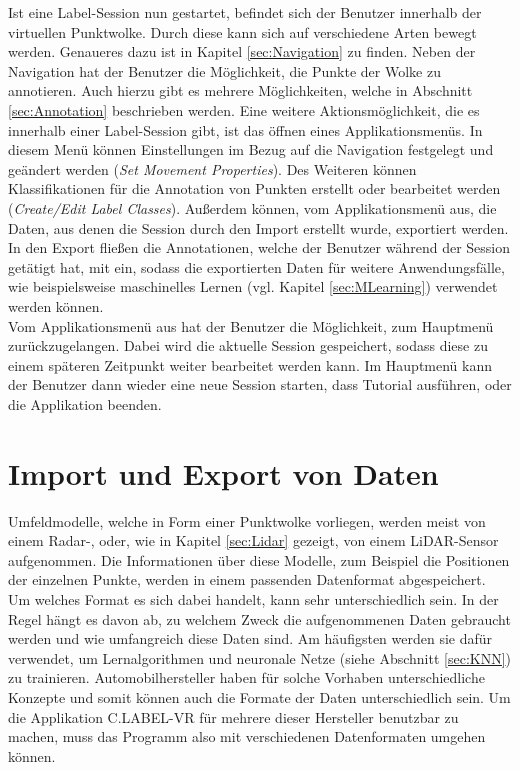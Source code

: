 Ist eine Label-Session nun gestartet, befindet sich der Benutzer innerhalb der virtuellen Punktwolke. Durch diese kann sich auf verschiedene Arten bewegt werden. Genaueres dazu ist in Kapitel \ref{sec:Navigation} zu finden. Neben der Navigation hat der Benutzer die Möglichkeit, die Punkte der Wolke zu annotieren. Auch hierzu gibt es mehrere Möglichkeiten, welche in Abschnitt \ref{sec:Annotation} beschrieben werden. Eine weitere Aktionsmöglichkeit, die es innerhalb einer Label-Session gibt, ist das öffnen eines Applikationsmenüs. In diesem Menü können Einstellungen im Bezug auf die Navigation festgelegt und geändert werden (\textit{Set Movement Properties}). Des Weiteren können Klassifikationen für die Annotation von Punkten erstellt oder bearbeitet werden (\textit{Create/Edit Label Classes}). Außerdem können, vom Applikationsmenü aus, die Daten, aus denen die Session durch den Import erstellt wurde, exportiert werden. In den Export fließen die Annotationen, welche der Benutzer während der Session getätigt hat, mit ein, sodass die exportierten Daten für weitere Anwendungsfälle, wie beispielsweise maschinelles Lernen (vgl. Kapitel \ref{sec:MLearning}) verwendet werden können.\\

Vom Applikationsmenü aus hat der Benutzer die Möglichkeit, zum Hauptmenü zurückzugelangen. Dabei wird die aktuelle Session gespeichert, sodass diese zu einem späteren Zeitpunkt weiter bearbeitet werden kann. Im Hauptmenü kann der Benutzer dann wieder eine neue Session starten, dass Tutorial ausführen, oder die Applikation beenden.


\section{Import und Export von Daten}
\label{sec:ImportExport}
Umfeldmodelle, welche in Form einer Punktwolke vorliegen, werden meist von einem Radar-, oder, wie in Kapitel \ref{sec:Lidar} gezeigt, von einem LiDAR-Sensor aufgenommen. Die Informationen über diese Modelle, zum Beispiel die Positionen der einzelnen Punkte, werden in einem passenden Datenformat abgespeichert. Um welches Format es sich dabei handelt, kann sehr unterschiedlich sein. In der Regel hängt es davon ab, zu welchem Zweck die aufgenommenen Daten gebraucht werden und wie umfangreich diese Daten sind. Am häufigsten werden sie dafür verwendet, um Lernalgorithmen und neuronale Netze (siehe Abschnitt \ref{sec:KNN}) zu trainieren. Automobilhersteller haben für solche Vorhaben unterschiedliche Konzepte und somit können auch die Formate der Daten unterschiedlich sein. Um die Applikation C.LABEL-VR für mehrere dieser Hersteller benutzbar zu machen, muss das Programm also mit verschiedenen Datenformaten umgehen können.\\ 

